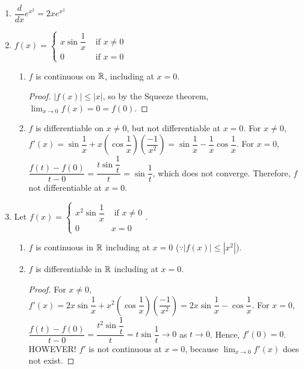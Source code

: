 \begin{example}
	\begin{enumerate}
		\item $\dfrac{d}{dx}e^{x^2}=2xe^{x^{2}}$
		\item $f(x)=\begin{cases}
				      x \sin{\dfrac{1}{x}} & \text{ if } x\neq 0 \\
				      0                    & \text{ if } x=0
			      \end{cases}$
		      \begin{remark}
			      \begin{enumerate}
				      \item
				            $f$ is continuous on $\mathbb{R}$, including at $x=0$.
				            \begin{proof}
					            $|f(x)|\le |x|$, so by the Squeeze theorem, $\lim_{x\to 0}{f(x)}=0=f(0)$.
				            \end{proof}
				      \item $f$ is differentiable on $x\neq 0$, but not differentiable at $x=0$.
				            For $x\neq 0$, $f'(x)=\sin{\dfrac{1}{x}}+x(\cos{\dfrac{1}{x}})(\dfrac{-1}{x^2})=\sin{\dfrac{1}{x}}-\dfrac{1}{x}\cos{\dfrac{1}{x}}$.
				            For $x=0$, $\dfrac{f(t)-f(0)}{t-0}=\dfrac{t \sin{\dfrac{1}{t}}}{t}=\sin{\dfrac{1}{t}}$, which does not converge. Therefore, $f$ not differentiable at $x=0$.
			      \end{enumerate}
		      \end{remark}
		\item Let $f(x)= \begin{cases}
				      x^2 \sin{\dfrac{1}{x}} & \text{ if } x\neq 0 \\
				      0                      & x=0
			      \end{cases}$.
		      \begin{enumerate}
			      \item
			            $f$ is continuous in $\mathbb{R}$ including at $x=0$ ($\because |f(x)|\le |x^2|$).
			      \item $f$ is differentiable in $\mathbb{R}$ including at $x=0$.
			            \begin{proof}
				            For $x\neq 0$, $f'(x)=2x \sin{\dfrac{1}{x}}+x^2(\cos{\dfrac{1}{x}})(\dfrac{-1}{x^2})=2x \sin{\dfrac{1}{x}}-\cos{\dfrac{1}{x}}$.
				            For $x=0$, $\dfrac{f(t)-f(0)}{t-0}= \dfrac{t^2 \sin{\dfrac{1}{t}}}{t}=t \sin{\dfrac{1}{t}}\to 0$ as $t\to 0$. Hence, $f'(0)=0$.
				            HOWEVER! $f'$ is not continuous at $x=0$, because $\lim_{x\to 0}{f'(x)}$ does not exist.
			            \end{proof}
		      \end{enumerate}
	\end{enumerate}
\end{example}
